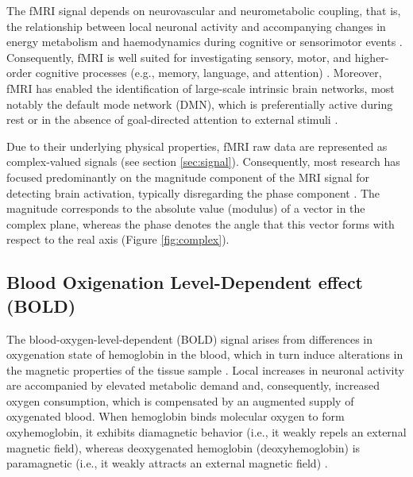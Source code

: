 The fMRI signal depends on neurovascular and neurometabolic coupling, that is, the relationship between local neuronal activity and accompanying changes in energy metabolism and haemodynamics during cognitive or sensorimotor events  \citep{uludagIntegrativeModelNeuronal2009a}. Consequently, fMRI is well suited for investigating sensory, motor, and higher-order cognitive processes (e.g., memory, language, and attention) \citep{logothetisWhatWeCan2008, vanderzwaagFMRI1532009, viswanathanNeurometabolicCouplingCerebral2007}. Moreover, fMRI has enabled the identification of large-scale intrinsic brain networks, most notably the default mode network (DMN), which is preferentially active during rest or in the absence of goal-directed attention to external stimuli \citep{menon20YearsDefault2023a}.

Due to their underlying physical properties, fMRI raw data are represented as complex-valued signals (see section \ref{sec:signal}). Consequently, most research has focused predominantly on the magnitude component of the MRI signal for detecting brain activation, typically disregarding the phase component \citep{hagbergPhaseVariationsFMRI2014}. The magnitude corresponds to the absolute value (modulus) of a vector in the complex plane, whereas the phase denotes the angle that this vector forms with respect to the real axis (Figure \ref{fig:complex}).



\subsection{Blood Oxigenation Level-Dependent effect (BOLD)}
\label{sec:BOLD}


The blood-oxygen-level-dependent (BOLD) signal arises from differences in oxygenation state of hemoglobin in the blood, which in turn induce alterations in the magnetic properties of the tissue sample \citep{ogawaOxygenationsensitiveContrastMagneticRodent}. Local increases in neuronal activity are accompanied by elevated metabolic demand and, consequently, increased oxygen consumption, which is compensated by an augmented supply of oxygenated blood. When hemoglobin binds molecular oxygen to form oxyhemoglobin, it exhibits diamagnetic behavior (i.e., it weakly repels an external magnetic field), whereas deoxygenated hemoglobin (deoxyhemoglobin) is paramagnetic (i.e., it weakly attracts an external magnetic field) \citep{paulingMagneticPropertiesStructure1936}. 

